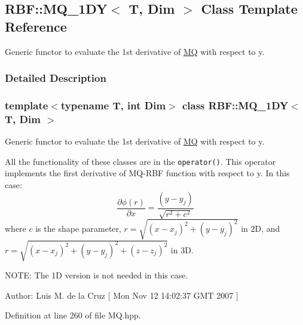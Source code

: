 \hypertarget{classRBF_1_1MQ__1DY}{
\subsection{RBF::MQ\_\-1DY$<$ T, Dim $>$ Class Template Reference}
\label{classRBF_1_1MQ__1DY}
}
Generic functor to evaluate the 1st derivative of \hyperlink{classRBF_1_1MQ}{MQ} with respect to y.  




\subsubsection{Detailed Description}
\subsubsection*{template$<$typename T, int Dim$>$ class RBF::MQ\_\-1DY$<$ T, Dim $>$}

Generic functor to evaluate the 1st derivative of \hyperlink{classRBF_1_1MQ}{MQ} with respect to y. 

All the functionality of these classes are in the {\tt operator()}. This operator implements the first derivative of MQ-RBF function with respect to y. In this case: \[ \frac{\partial \phi(r)}{\partial x} = \frac{(y-y_j)}{\sqrt{r^2+c^2}} \] where $ c $ is the shape parameter, $ r = \sqrt{(x - x_j)^2 + (y - y_j)^2} $ in 2D, and $ r = \sqrt{(x - x_j)^2 + (y - y_j)^2 + (z - z_j)^2} $ in 3D. \begin{Desc}
\item[NOTE: The 1D version is not needed in this case.]\end{Desc}
\begin{Desc}
\item[Author:]Luis M. de la Cruz \mbox{[} Mon Nov 12 14:02:37 GMT 2007 \mbox{]} \end{Desc}


Definition at line 260 of file MQ.hpp.
